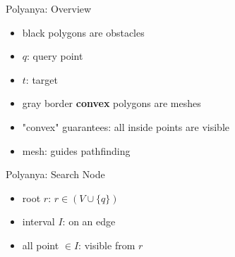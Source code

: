 \begin{frame}{Polyanya: Overview}

\begin{minipage}{.4\textwidth}
\begin{itemize}
    \item \small black polygons are obstacles
    \item \small $q$: query point
    \item \small $t$: target
    \item \small gray border \textbf{convex} polygons are meshes
    \item \small "convex" guarantees: all inside points are visible
    \item \small mesh: guides pathfinding
\end{itemize}

\end{minipage}%
\begin{minipage}{.6\textwidth}
\begin{adjustbox}{max totalsize={.9\textwidth}{.9\textheight}, right}
\end{adjustbox}
\end{minipage}
\end{frame}

\begin{frame}{Polyanya: Search Node}

\begin{minipage}{.4\textwidth}
\begin{itemize}
    \item \small root $r$: $r \in (V \cup \{q\})$
    \item \small interval $I$: on an edge
    \item \small all point $\in I$: visible from $r$
\end{itemize}
\end{minipage}%
\begin{minipage}{.6\textwidth}
\begin{adjustbox}{max totalsize={.9\textwidth}{.9\textheight}, right}
\end{adjustbox}
\end{minipage}

\end{frame}

